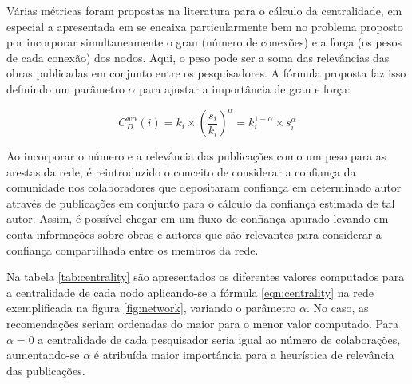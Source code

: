 \documentclass[12pt]{article}
\begin{document}
Várias métricas foram propostas na literatura para o cálculo da centralidade, em especial a apresentada em \cite{opsahl2010node} 
se encaixa particularmente bem no problema proposto por incorporar simultaneamente o grau (número de conexões) e a força 
(os pesos de cada conexão) dos nodos. Aqui, o peso pode ser a soma das relevâncias das obras publicadas em conjunto entre os 
pesquisadores. A fórmula proposta faz isso definindo um parâmetro $\alpha$ para ajustar a importância de grau e força:

\begin{equation} \label{eqn:centrality} 
 C_D ^{w \alpha} (i) = k_i \times \left( \frac {s_i} {k_i} \right) ^{\alpha} = k_i ^{1 - \alpha} \times s _i ^{\alpha}
\end{equation}

Ao incorporar o número e a relevância das publicações como um peso para as arestas da rede, é reintroduzido o conceito de 
considerar a confiança da comunidade nos colaboradores que depositaram confiança em determinado autor através de publicações 
em  conjunto para o cálculo da confiança estimada de tal autor. Assim, é possível chegar em um fluxo de confiança apurado
levando em conta informações sobre obras e autores que são relevantes para considerar a confiança compartilhada entre 
os membros da rede.

Na tabela \ref{tab:centrality} são apresentados os diferentes valores computados para a centralidade de cada nodo aplicando-se a 
fórmula \ref{eqn:centrality} na rede exemplificada na figura \ref{fig:network}, variando o parâmetro $\alpha$. No caso, as 
recomendações seriam ordenadas do maior para o menor valor computado. Para $\alpha = 0$ a centralidade de cada pesquisador seria 
igual ao número de colaborações, aumentando-se $\alpha$ é atribuída maior importância para a heurística de relevância das 
publicações.

\end{document}
